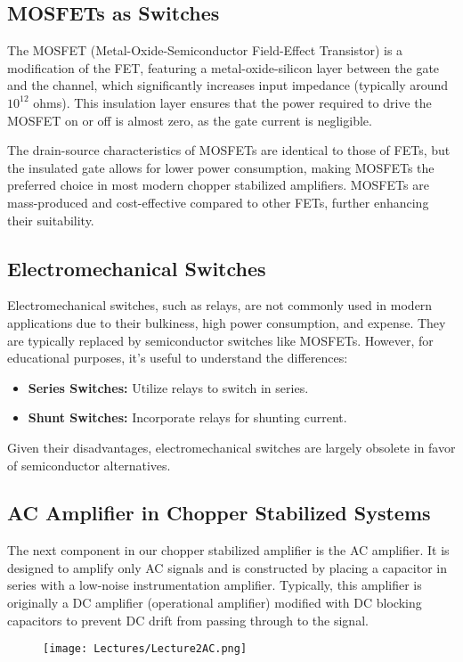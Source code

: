 \documentclass[a4paper,9pt,twoside,openany,twocolumn]{memoir}
\begin{document}
\subsection{MOSFETs as Switches}
The MOSFET (Metal-Oxide-Semiconductor Field-Effect Transistor) is a modification of the FET, featuring a metal-oxide-silicon layer between the gate and the channel, which significantly increases input impedance (typically around $10^{12}$ ohms). This insulation layer ensures that the power required to drive the MOSFET on or off is almost zero, as the gate current is negligible.

The drain-source characteristics of MOSFETs are identical to those of FETs, but the insulated gate allows for lower power consumption, making MOSFETs the preferred choice in most modern chopper stabilized amplifiers. MOSFETs are mass-produced and cost-effective compared to other FETs, further enhancing their suitability.

\subsection{Electromechanical Switches}
Electromechanical switches, such as relays, are not commonly used in modern applications due to their bulkiness, high power consumption, and expense. They are typically replaced by semiconductor switches like MOSFETs. However, for educational purposes, it's useful to understand the differences:
\begin{itemize}
    \item \textbf{Series Switches:} Utilize relays to switch in series.
    \item \textbf{Shunt Switches:} Incorporate relays for shunting current.
\end{itemize}
Given their disadvantages, electromechanical switches are largely obsolete in favor of semiconductor alternatives.

\subsection{AC Amplifier in Chopper Stabilized Systems}
The next component in our chopper stabilized amplifier is the AC amplifier. It is designed to amplify only AC signals and is constructed by placing a capacitor in series with a low-noise instrumentation amplifier. Typically, this amplifier is originally a DC amplifier (operational amplifier) modified with DC blocking capacitors to prevent DC drift from passing through to the signal.
\begin{figure}[h!]
    \centering
    \texttt{[image: Lectures/Lecture2AC.png]} %

\end{figure}
\end{document}
